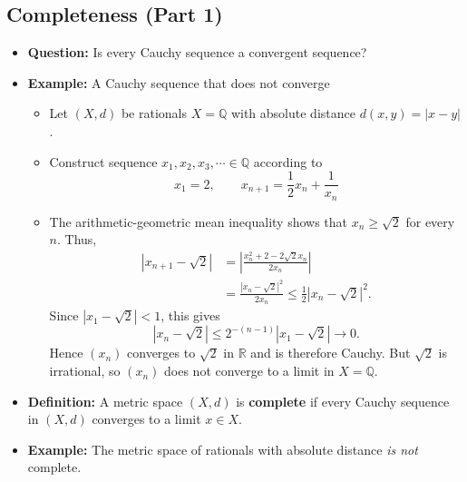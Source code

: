 \documentclass[11pt,twoside]{report}
\newcommand{\bbQ}{{\mathbb{Q}}}
\begin{document}
\subsection{Completeness (Part 1)} 

\begin{itemize}

\item \textbf{Question:} Is every Cauchy sequence a convergent sequence?


\item \textbf{Example:}  A Cauchy sequence that does not converge 
\begin{itemize}
\item Let $(X, d)$ be rationals $X = \bbQ$ with absolute distance $d(x,y) = |x- y|$. 
\item Construct sequence $x_1, x_2, x_3, \cdots \in \bbQ$ according to 
\[
x_1 = 2, \qquad x_{n+1} = \frac{1}{2} x_n + \frac{1}{x_n} 
\]
\item The arithmetic-geometric mean inequality shows that $x_n \geq \sqrt{2}$ for every $n$.  Thus,
\begin{align*}
\left|x_{n+1}-\sqrt{2}\right|
&= \left|\frac{x_n^2+2-2\sqrt{2}x_n}{2x_n}\right| \\
&= \frac{\left|x_n-\sqrt{2}\right|^2}{2x_n}
 \leq \frac{1}{2}\left|x_n-\sqrt{2}\right|^2.
\end{align*}
Since $|x_1-\sqrt{2}|<1$, this gives
\[
\left|x_n-\sqrt{2}\right| \leq 2^{-(n-1)}\left|x_1-\sqrt{2}\right| \longrightarrow 0.
\]
Hence $(x_n)$ converges to $\sqrt{2}$ in $\mathbb{R}$ and is therefore Cauchy.  But $\sqrt{2}$ is irrational, so $(x_n)$ does not converge to a limit in $X=\mathbb{Q}$.
\end{itemize}




\item \textbf{Definition:} A metric space $(X,d)$ is  \textbf{complete} if every Cauchy sequence in $(X,d)$ converges to a limit $x \in X$.

\item \textbf{Example:}  The metric space of rationals with absolute distance \emph{is not} complete. 

%


\end{itemize}
\end{document}
